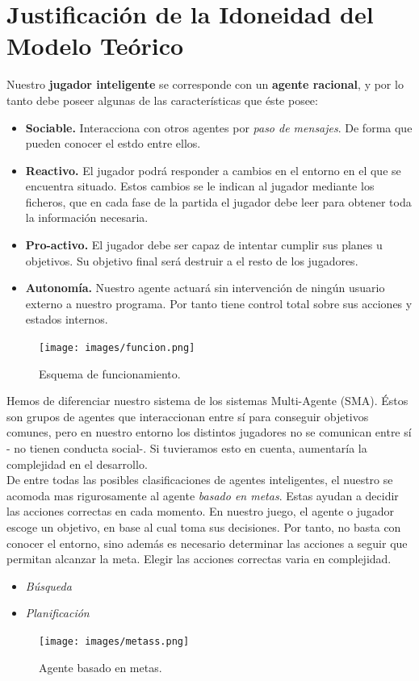 \documentclass[a4paper,12pt,oneside]{book}
\begin{document}
\chapter{Justificación de la Idoneidad del Modelo Teórico}


Nuestro {\bf jugador inteligente} se corresponde con un {\bf agente racional}, y
por lo tanto debe poseer algunas de las características que éste posee:
\begin{itemize}
\item {\bf Sociable.} Interacciona con otros agentes por {\it paso de
    mensajes}. De forma que pueden conocer el estdo entre ellos.
\item {\bf Reactivo.} El jugador podrá responder a cambios en el
  entorno en el que se encuentra situado. Estos cambios se le indican
  al jugador mediante los ficheros, que en cada fase de la partida el
  jugador debe leer para obtener toda la información necesaria.
\item {\bf Pro-activo.} El jugador debe ser capaz de intentar cumplir
  sus planes u objetivos. Su objetivo final será destruir a el resto
  de los jugadores.
\item {\bf Autonomía.} Nuestro agente actuará sin intervención de
  ningún usuario externo a nuestro programa. Por tanto tiene control
  total sobre sus acciones y estados internos.
\end{itemize}


\begin{figure}[!h]
  \centering
  \texttt{[image: images/funcion.png]}
  \caption{Esquema de funcionamiento.}
\end{figure}


Hemos de diferenciar nuestro sistema de los sistemas Multi-Agente
(SMA). Éstos son grupos de agentes que interaccionan entre sí para
conseguir objetivos comunes, pero en nuestro entorno los distintos
jugadores no se comunican entre sí - no tienen conducta social-. Si
tuvieramos esto en cuenta, aumentaría la complejidad en el
desarrollo.\\

De entre todas las posibles clasificaciones de agentes inteligentes,
el nuestro se acomoda mas rigurosamente al agente {\it basado en
  metas}. Estas ayudan a decidir las acciones correctas en cada
momento. En nuestro juego, el agente o jugador escoge un objetivo, en
base al cual toma sus decisiones. Por tanto, no basta con conocer el
entorno, sino además es necesario determinar las acciones a seguir que
permitan alcanzar la meta. Elegir las acciones correctas varia en
complejidad. 
\begin{itemize}
\item {\it Búsqueda}
\item {\it Planificación}
\end{itemize}
\begin{figure}[!h]
  \centering
  \texttt{[image: images/metass.png]}
  \caption{Agente basado en metas.}
\end{figure}
\end{document}
